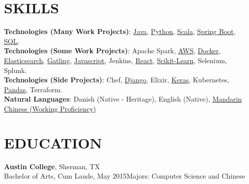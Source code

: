 \documentclass[margin]{res}
\begin{document}
\begin{resume}
\section{SKILLS}

\textbf{Technologies (Many Work Projects)}:
\href{https://www.lucaskjaerozhang.com/technology/java/}{Java},
\href{https://www.lucaskjaerozhang.com/technology/python/}{Python},
\href{https://www.lucaskjaerozhang.com/technology/scala/}{Scala},
\href{https://www.lucaskjaerozhang.com/technology/spring-boot/}{Spring Boot},
\href{https://www.lucaskjaerozhang.com/technology/sql/}{SQL}.
\\
\textbf{Technologies (Some Work Projects)}:
Apache Spark,
\href{https://www.lucaskjaerozhang.com/technology/aws/}{AWS},
\href{https://www.lucaskjaerozhang.com/technology/docker/}{Docker},
\href{https://www.lucaskjaerozhang.com/technology/elasticsearch/}{Elasticsearch},
\href{https://www.lucaskjaerozhang.com/technology/gatling/}{Gatling},
\href{https://www.lucaskjaerozhang.com/technology/javascript/}{Javascript},
Jenkins,
\href{https://www.lucaskjaerozhang.com/technology/react/}{React},
\href{https://www.lucaskjaerozhang.com/technology/sklearn/}{Scikit-Learn},
Selenium,
Splunk.
\\
\textbf{Technologies (Side Projects)}:
Chef,
\href{https://www.lucaskjaerozhang.com/technology/django/}{Django},
Elixir,
\href{https://www.lucaskjaerozhang.com/technology/keras/}{Keras},
Kubernetes,
\href{https://www.lucaskjaerozhang.com/technology/pandas/}{Pandas},
Terraform.
\\
\textbf{Natural Languages}: Danish (Native - Heritage), English (Native), \href{https://www.lucaskjaerozhang.com/lucas-kjaero-zhang-%E4%B8%AA%E4%BA%BA%E7%AE%80%E5%8E%86.pdf}{Mandarin Chinese (Working Proficiency)}


\section{EDUCATION}
\textbf{Austin College}, Sherman, TX\\
Bachelor of Arts, Cum Laude, May 2015\hfill Majors: Computer Science and Chinese\\


\end{resume}
\end{document}
